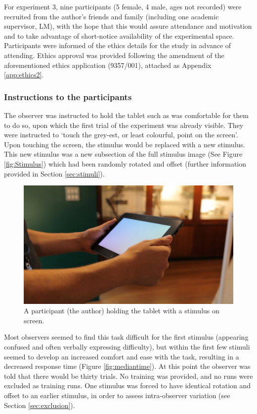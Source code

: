 For experiment 3, nine participants (5 female, 4 male, ages not recorded) were recruited from the author's friends and family (including one academic supervisor, LM), with the hope that this would assure attendance and motivation and to take advantage of short-notice availability of the experimental space. Participants were informed of the ethics details for the study in advance of attending. Ethics approval was provided following the amendment of the aforementioned ethics application (9357/001), attached as Appendix \ref{app:ethics2}.

\subsubsection{Instructions to the participants}

The observer was instructed to hold the tablet such as was comfortable for them to do so, upon which the first trial of the experiment was already visible. They were instructed to `touch the grey-est, or least colourful, point on the screen'. Upon touching the screen, the stimulus would be replaced with a new stimulus. This new stimulus was a new subsection of the full stimulus image (See Figure \ref{fig:Stimulus}) which had been randomly rotated and offset (further information provided in Section \ref{sec:stimuli}).

\begin{figure}[hbtp]
\includegraphics[max width=\textwidth]{figs/tablet/MVI_3213-1.jpg} %
\caption{A participant (the author) holding the tablet with a stimulus on screen.}
\label{fig:grant_demo}
\end{figure}

Most observers seemed to find this task difficult for the first stimulus (appearing confused and often verbally expressing difficulty), but within the first few stimuli seemed to develop an increased comfort and ease with the task, resulting in a decreased response time (Figure \ref{fig:mediantime}). At this point the observer was told that there would be thirty trials. No training was provided, and no runs were excluded as training runs. One stimulus was forced to have identical rotation and offset to an earlier stimulus, in order to assess intra-observer variation (see Section \ref{sec:exclusion}).

